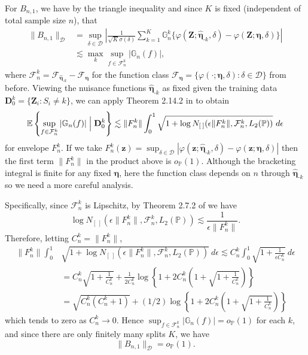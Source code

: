 \documentclass[12pt]{article}
\newcommand{\Pb}{\mathbb{P}}
\newcommand{\Gn}{\mathbb{G}_n}
\newcommand{\E}{\mathbb{E}}
\newcommand{\bZ}{\mathbf{Z}}
\newcommand{\bz}{\mathbf{z}}
\newcommand{\bD}{\mathbf{D}}
\theoremstyle{remark}
\begin{document}
For $B_{n,1}$, we have by the triangle inequality and since $K$ is fixed (independent of total sample size $n$), that
\begin{align*}
\| B_{n,1} \|_\mathcal{D} &= \sup_{\delta \in \mathcal{D}} \left| \frac{1}{\sqrt{K} \sigma(\delta)} \sum_{k=1}^K \Gn^k \Big\{ \varphi(\bZ; \hat{\boldsymbol\eta}_{\text{-}k},\delta) -\varphi(\bZ;\boldsymbol\eta, \delta) \Big\} \right| \\
&\lesssim \max_k \sup_{f \in \mathcal{F}_n^k} \left| \Gn(f) \right| , 
\end{align*}
where $\mathcal{F}_n^k = \mathcal{F}_{\hat{\boldsymbol\eta}_{\text{-}k}} - \mathcal{F}_{\boldsymbol{\eta}}$ for the function class $\mathcal{F}_{\boldsymbol\eta} = \{ \varphi(\cdot; \boldsymbol\eta, \delta) : \delta \in \mathcal{D} \}$ from before. Viewing the nuisance functions $\hat{\boldsymbol\eta}_{\text{-}k}$ as fixed given the training data $\bD_0^k = \{\bZ_i : S_i \neq k\}$, we can apply Theorem 2.14.2 in \textcite{van1996weak} to obtain
$$ \E \left\{ \sup_{f \in \mathcal{F}_n^k} \left| \Gn(f) \right|  \Bigm| \bD_0^k \right\} \lesssim \| F_n^k \| \int_0^1 \sqrt{ 1 + \log N_{[ \ \! ]}(\epsilon  \| F_n^k \|, \mathcal{F}_n^k , L_2(\Pb) )} \ d\epsilon   $$
for envelope $F_n^k$. If we take $F_n^k(\bz)=\sup_{\delta \in \mathcal{D}} | \varphi(\bz; \hat{\boldsymbol\eta}_{\text{-}k},\delta) - \varphi(\bz; \boldsymbol\eta,\delta)| $ then the first term $\| F_n^k \|$ in the product above is $o_\Pb(1)$. Although the bracketing integral is finite for any fixed $\boldsymbol\eta$, here the function class depends on $n$ through $\hat{\boldsymbol\eta}_{\text{-}k}$ so we need a more careful analysis.

Specifically, since $\mathcal{F}_n^k$ is Lipschitz, by Theorem 2.7.2 of \textcite{van1996weak} we have
$$ \log N_{[ \ \! ]}(\epsilon  \| F_n^k \|, \mathcal{F}_n^k , L_2(\Pb) ) \lesssim \frac{1}{\epsilon  \| F_n^k \|} . $$
Therefore, letting $C_n^k= \| F_n^k \|$,
\begin{align*}
\| F_n^k \|  \int_0^1 &\sqrt{ 1 + \log N_{[ \ \! ]}(\epsilon  \| F_n^k \|, \mathcal{F}_n^k , L_2(\Pb) )} \ d\epsilon \lesssim C_n^k \int_0^1 \sqrt{ 1 + \frac{1}{\epsilon C_n^k} } \ d\epsilon \\
&= C_n^k \sqrt{1+\frac{1}{C_n^k}} + \frac{1}{2C_n^k} \log\left\{ 1 + 2C_n^k \left( 1+ \sqrt{1+\frac{1}{C_n^k}} \right) \right\} \\
&= \sqrt{ C_n^k(C_n^k + 1)} + (1/2) \log\left\{ 1 + 2C_n^k \left( 1+ \sqrt{1+\frac{1}{C_n^k}} \right) \right\} 
\end{align*}
which tends to zero as $C_n^k \rightarrow 0$. Hence $\sup_{f \in \mathcal{F}_n^k} \left| \Gn(f) \right| = o_\Pb(1)$ for each $k$, and since there are only finitely many splits $K$, we have
$$ \| B_{n,1} \|_\mathcal{D} = o_\Pb(1) . $$
\end{document}

